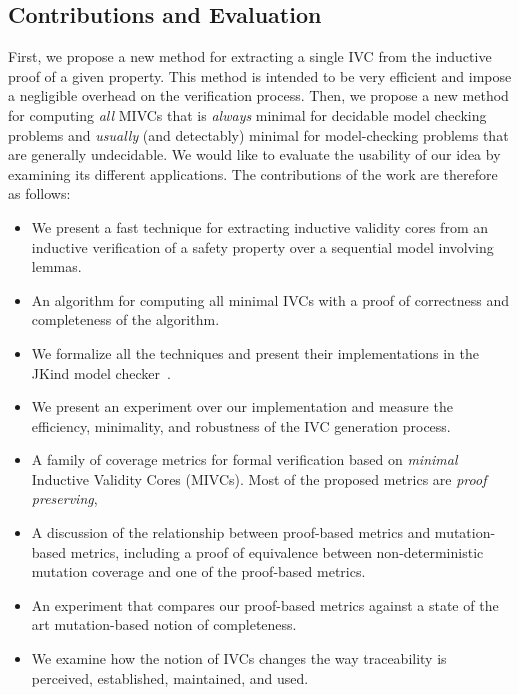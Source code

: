 \subsection{Contributions and Evaluation}
First, we propose a new method for extracting a single IVC from the inductive proof of a given property. This method is intended to be very efficient and impose a negligible overhead on the verification process.
Then, we propose a new method for computing \emph{all} MIVCs that is {\em always} minimal for decidable model checking problems and {\em usually} (and detectably) minimal for model-checking problems that are generally undecidable. We would like to evaluate the usability of our idea by examining its different applications.
The contributions of the work are therefore as follows:
\begin{itemize}
    \item We present a fast technique for extracting inductive validity
      cores from an inductive verification of a safety property over a sequential model involving lemmas.
    \item An algorithm for computing all minimal IVCs with a proof of correctness and completeness of the algorithm.
    \item We formalize all the techniques and present their implementations in the JKind model checker~\cite{jkind}.
    \item We present an experiment over our implementation and measure the efficiency, minimality, and robustness of the IVC generation process.
   \item A family of coverage metrics for formal verification based on \emph{minimal} Inductive Validity Cores (MIVCs).  Most of the proposed metrics are {\em proof preserving},
\item A discussion of the relationship between proof-based metrics and mutation-based metrics, including a proof of equivalence between non-deterministic mutation coverage and one of the proof-based metrics.
\item An experiment that compares our proof-based metrics against a state of the art mutation-based notion of completeness.
    \item We examine how the notion of IVCs changes the way traceability is perceived, established, maintained, and used.
\end{itemize}


